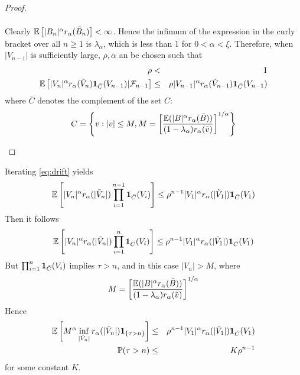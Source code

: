 \documentclass{article}
\begin{document}
\begin{proof}
\begin{enumerate}[(i)]
\begin{eqnarray*}
    \end{eqnarray*}
    Clearly $\mathbb{E}\left[|B_n|^\alpha r_{\alpha}(\tilde B_n)\right] <
    \infty$. Hence the infimum of the expression in the curly bracket
    over all $n \geq 1$ is $\lambda_{\alpha}$, which is less than 1 for $0 < \alpha < \xi$.    
    Therefore, when $|V_{n-1}|$ is sufficiently large, $\rho, \alpha$ an be
    chosen such that
    \begin{eqnarray*}
      \rho &<& 1 \\
      \mathbb{E} \left[ |V_n|^\alpha r_{\alpha}(\tilde V_n)  \mathbf{1}_{\bar C}(V_{n-1})
        | \mathcal F_{n-1} \right] &\leq&
      \rho |V_{n-1}|^\alpha r_{\alpha}(\tilde V_{n-1}) \mathbf{1}_{\bar C}(V_{n-1})
    \end{eqnarray*}
    where $\bar C$ denotes the complement of the set $C$:
    \[
    C = \left\{
      v: |v| \leq M, M = \left[
        \mathbb{E} (|B|^\alpha r_\alpha(\tilde B)) 
        \over
        (1 - \lambda_\alpha) r_\alpha(\tilde v)
      \right]^{1/\alpha}
    \right\}
    \]
  \end{enumerate}    
\end{proof}
  Iterating \eqref{eq:drift} yields
  \[
  \mathbb{E} \left[
         |V_n|^\alpha r_{\alpha}(|\tilde V_n|) \prod_{i=1}^{n-1}\mathbf{1}_{\bar
          C}(V_i)\right]
      \leq \rho^{n-1} |V_1|^\alpha r_{\alpha}(|\tilde V_1|) \mathbf{1}_{\bar C}(V_1)
  \]
  Then it follows
  \[
  \mathbb{E} \left[
         |V_n|^\alpha r_{\alpha}(|\tilde V_n|) \prod_{i=1}^{n}\mathbf{1}_{\bar
          C}(V_i)\right]
      \leq \rho^{n-1} |V_1|^\alpha r_{\alpha}(|\tilde V_1|) \mathbf{1}_{\bar C}(V_1)
  \]
  But $\prod_{i=1}^{n}\mathbf{1}_{\bar C}(V_i)$ implies $\tau > n$, and in this
  case $|V_n| > M$, where
  \[
  M = \left[
        \mathbb{E} (|B|^\alpha r_\alpha(\tilde B)) 
        \over
        (1 - \lambda_\alpha) r_\alpha(\tilde v)
      \right]^{1/\alpha}
  \]
  Hence
  \begin{eqnarray}
    \mathbb{E} \left[
      M^\alpha \inf_{|\tilde V_n|} r_{\alpha}(|\tilde V_n|) \mathbf{1}_{\{\tau > n\}}\right]
    &\leq& \rho^{n-1} |V_1|^\alpha r_{\alpha}(|\tilde V_1|) \mathbf{1}_{\bar
      C}(V_1) \nonumber \\
    \mathbb{P}(\tau > n) &\leq& K \rho^{n-1} \label{eq:ret_time}
  \end{eqnarray}
  for some constant $K$.
  
\end{document}
